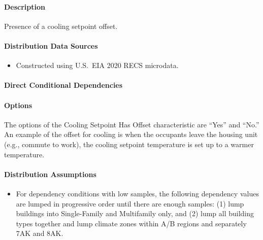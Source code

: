 \paragraph{Description}
% 
Presence of a cooling setpoint offset.

\paragraph{Distribution Data Sources}
% 
\begin{itemize}
    \item Constructed using U.S.~EIA 2020 RECS microdata.
\end{itemize}

\paragraph{Direct Conditional Dependencies}


\paragraph{Options}
The options of the Cooling Setpoint Has Offset characteristic are ``Yes'' and ``No.'' An example of the offset for cooling is when the occupants leave the housing unit (e.g., commute to work), the cooling setpoint temperature is set up to a warmer temperature.

\paragraph{Distribution Assumptions}
% 
\begin{itemize}
    \item For dependency conditions with low samples, the following dependency values are lumped in progressive order until there are enough samples: (1) lump buildings into Single-Family and Multifamily only, and (2) lump all building types together and lump climate zones within A/B regions and separately 7AK and 8AK.
\end{itemize}
